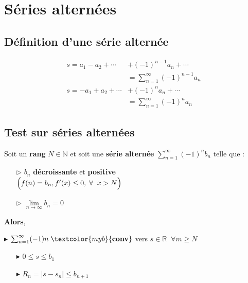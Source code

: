\documentclass{report}
\begin{document}
\begin{multicols*}{3}
\begin{center}
\begin{tikzpicture}[xscale=0.7, yscale=0.4]
    \end{tikzpicture}
    \end{center}


     \chapter{Séries alternées}

     \section{Définition d'une série alternée}
     \vspace{-2em}
     \begin{align*}
         s=a_1-a_2+\cdots&+(-1)^{n-1}a_n +\cdots 
         \\
         &=\sum_{n=1}^\infty(-1)^{n-1}a_n
         \\
         s=-a_1+a_2 +\cdots&+(-1)^na_n+\cdots 
         \\
         &=\sum_{n=1}^\infty(-1)^na_n                
     \end{align*}               




     \section{Test sur séries alternées}
     Soit un \textbf{rang} $N \in \mathbb{N}$ et 
     soit une \textbf{série alternée} 
     $\sum_{n=1}^{\infty } (-1)^nb_n$ telle que :
     \begin{itemize}
       \item [$\rhd$ ]  $b_n$ \textbf{décroissante}  et \textbf{positive} \\
           $\Bigl(f(n) = b_n, f^{\prime}(x) \leq 0, \; \forall \;\; x > N\Bigr)$
       \item [$\rhd$ ] $\lim\limits_{n\to\infty }b_n = 0$ 
     \end{itemize}
     
     \textbf{Alors}, 

    \noindent
    $\blacktriangleright$
    $\sum_{n=1}^{\infty }  (-1)n \; \textcolor{myb}{\textbf{conv}}$ vers $s \in
    \mathbb{R} \;\; \forall m \geq N $ 

     \begin{itemize}
    \item[$\blacktriangleright$]
    $0 \leq s \leq b_1$ 
        \item[$\blacktriangleright$] 
    $R_n = |s - s_n | \leq b_{n+1}$
     \end{itemize}
\vspace{-3.5em}

\end{multicols*}
\end{document}
